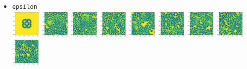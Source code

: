 \begin{itemize}
\item {\tt epsilon}\\
\includegraphics[height=1.4cm]{python_codes/fieldstone_171/pearson93_rand/epsilon_solution_0001000_u}
\includegraphics[height=1.4cm]{python_codes/fieldstone_171/pearson93_rand/epsilon_solution_0005000_u}
\includegraphics[height=1.4cm]{python_codes/fieldstone_171/pearson93_rand/epsilon_solution_0010000_u}
\includegraphics[height=1.4cm]{python_codes/fieldstone_171/pearson93_rand/epsilon_solution_0015000_u}
\includegraphics[height=1.4cm]{python_codes/fieldstone_171/pearson93_rand/epsilon_solution_0020000_u}
\includegraphics[height=1.4cm]{python_codes/fieldstone_171/pearson93_rand/epsilon_solution_0030000_u}
\includegraphics[height=1.4cm]{python_codes/fieldstone_171/pearson93_rand/epsilon_solution_0040000_u}
\includegraphics[height=1.4cm]{python_codes/fieldstone_171/pearson93_rand/epsilon_solution_0050000_u}
\includegraphics[height=1.4cm]{python_codes/fieldstone_171/pearson93_rand/epsilon_solution_final_u}\\

\end{itemize}
